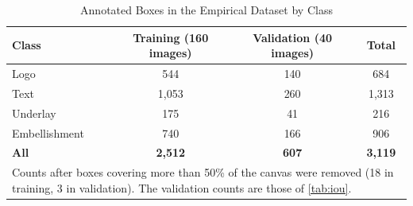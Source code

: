 \begin{theappendices}
\begin{table}[!ht]
\centering
\caption{Annotated Boxes in the Empirical Dataset by Class}
\label{tab:empirical-counts}
\begin{tabular}{l c c c}
\hline
\textbf{Class} & \textbf{Training (160 images)} & \textbf{Validation (40 images)} & \textbf{Total} \\ \hline
Logo & 544 & 140 & 684 \\
Text & 1,053 & 260 & 1,313 \\
Underlay & 175 & 41 & 216 \\
Embellishment & 740 & 166 & 906 \\ \hline
\textbf{All} & \textbf{2,512} & \textbf{607} & \textbf{3,119} \\ \hline
\multicolumn{4}{p{0.86\textwidth}}{\footnotesize Counts after boxes covering more than 50\% of the canvas were removed (18 in training, 3 in validation). The validation counts are those of \ref{tab:iou}.}
\end{tabular}
\end{table}


\end{theappendices}